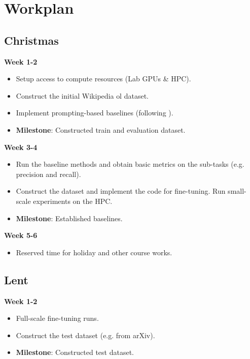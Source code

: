 \section*{Workplan}

\subsection*{Christmas}
\textbf{Week 1-2}
\begin{itemize}
    \item Setup access to compute resources (Lab GPUs \& HPC).
    \item Construct the initial Wikipedia \gls{ol} dataset.
    \item Implement prompting-based baselines (following \citet{llms4ol}).
    \item \textbf{Milestone}: Constructed train and evaluation dataset.
\end{itemize}

\textbf{Week 3-4}
\begin{itemize}
    \item Run the baseline methods and obtain basic metrics on the sub-tasks (e.g. precision and recall).
    \item Construct the dataset and implement the code for fine-tuning. Run small-scale experiments on the HPC.
    \item \textbf{Milestone}: Established baselines.
\end{itemize}

\textbf{Week 5-6}
\begin{itemize}
    \item Reserved time for holiday and other course works.
\end{itemize}

\subsection*{Lent}
\textbf{Week 1-2}
\begin{itemize}
    \item Full-scale fine-tuning runs.
    \item Construct the test dataset (e.g. from arXiv).
    \item \textbf{Milestone}: Constructed test dataset.
\end{itemize}

